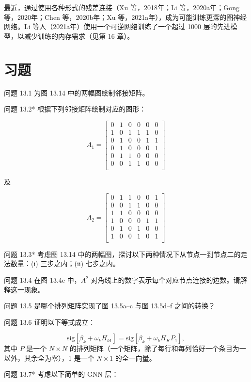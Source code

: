 最近，通过使用各种形式的残差连接（Xu 等，2018年；Li 等，2020a年；Gong 等，2020年；Chen 等，2020b年；Xu 等，2021a年），成为可能训练更深的图神经网络。Li 等人（2021a年）使用一个可逆网络训练了一个超过 1000 层的先进模型，以减少训练的内存需求（见第 16 章）。

\section{习题}
问题 13.1 为图 13.14 中的两幅图绘制邻接矩阵。

问题 13.2* 根据下列邻接矩阵绘制对应的图形：

\[
A_1 =
\begin{bmatrix}
0 & 1 & 0 & 0 & 0 & 0 \\
1 & 0 & 1 & 1 & 1 & 0 \\
0 & 1 & 0 & 0 & 1 & 1 \\
0 & 1 & 0 & 0 & 0 & 1 \\
0 & 1 & 1 & 0 & 0 & 0 \\
0 & 0 & 1 & 1 & 0 & 0 \\
\end{bmatrix}
\]

及

\[
A_2 =
\begin{bmatrix}
0 & 1 & 1 & 0 & 0 & 1 \\
0 & 0 & 1 & 1 & 0 & 0 \\
1 & 1 & 0 & 0 & 0 & 0 \\
1 & 0 & 0 & 0 & 1 & 1 \\
0 & 1 & 0 & 1 & 0 & 0 \\
1 & 0 & 0 & 1 & 0 & 1 \\
\end{bmatrix}
\]

问题 13.3* 考虑图 13.14 中的两幅图，探讨以下两种情况下从节点一到节点二的走法数量：(i) 三步之内；(ii) 七步之内。

问题 13.4 在图 13.4c 中，\(A^2\) 对角线上的数字表示每个对应节点连接的边数。请解释这一现象。

问题 13.5 是哪个排列矩阵实现了图 13.5a–c 与图 13.5d–f 之间的转换？

问题 13.6 证明以下等式成立：

\[
\text{sig}[\beta_k + \omega_k H_{k1}] = \text{sig}[\beta_k + \omega_k H_K P_{1}], \tag{13.27}
\]
其中 \(P\) 是一个 \(N \times N\) 的排列矩阵（一个矩阵，除了每行和每列恰好一个条目为一以外，其余全为零），1 是一个 \(N \times 1\) 的全一向量。

问题 13.7* 考虑以下简单的 GNN 层：


